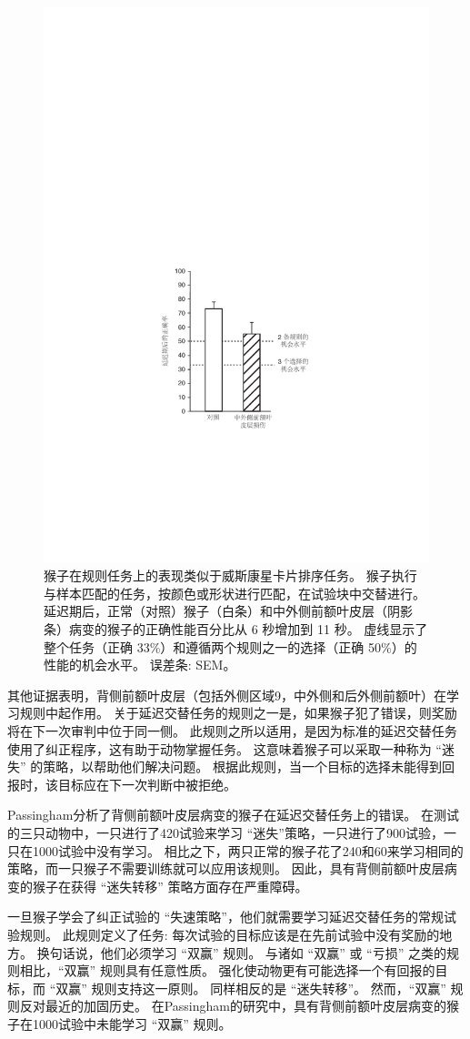 \begin{figure}
	\centering
	\includegraphics[width=0.63\linewidth]{chap6/6_6}
	\caption{猴子在规则任务上的表现类似于威斯康星卡片排序任务。
		猴子执行与样本匹配的任务，按颜色或形状进行匹配，在试验块中交替进行。
		延迟期后，正常（对照）猴子（白条）和中外侧前额叶皮层（阴影条）病变的猴子的正确性能百分比从 6 秒增加到 11 秒。
		虚线显示了整个任务（正确 33\%）和遵循两个规则之一的选择（正确 50\%）的性能的机会水平。
		误差条: SEM\cite{buckley2009dissociable}。}
	\label{fig:6_6}
\end{figure}


其他证据表明，背侧前额叶皮层（包括外侧区域9，中外侧和后外侧前额叶）在学习规则中起作用。
关于延迟交替任务的规则之一是，如果猴子犯了错误，则奖励将在下一次审判中位于同一侧。
此规则之所以适用，是因为标准的延迟交替任务使用了纠正程序，这有助于动物掌握任务。
这意味着猴子可以采取一种称为 “迷失” 的策略，以帮助他们解决问题。
根据此规则，当一个目标的选择未能得到回报时，该目标应在下一次判断中被拒绝。


Passingham\cite{passingham1975delayed}分析了背侧前额叶皮层病变的猴子在延迟交替任务上的错误。
在测试的三只动物中，一只进行了420试验来学习 “迷失”策略，一只进行了900试验，一只在1000试验中没有学习。
相比之下，两只正常的猴子花了240和60来学习相同的策略，而一只猴子不需要训练就可以应用该规则。
因此，具有背侧前额叶皮层病变的猴子在获得 “迷失转移” 策略方面存在严重障碍。


一旦猴子学会了纠正试验的 “失速策略”，他们就需要学习延迟交替任务的常规试验规则。
此规则定义了任务: 每次试验的目标应该是在先前试验中没有奖励的地方。
换句话说，他们必须学习 “双赢” 规则。
与诸如 “双赢” 或 “亏损” 之类的规则相比，“双赢” 规则具有任意性质。
强化使动物更有可能选择一个有回报的目标，而 “双赢” 规则支持这一原则。
同样相反的是 “迷失转移”。
然而，“双赢” 规则反对最近的加固历史。
在Passingham\cite{passingham1975delayed}的研究中，具有背侧前额叶皮层病变的猴子在1000试验中未能学习 “双赢” 规则。


